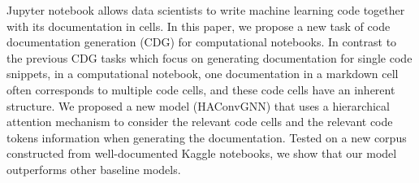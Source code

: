 Jupyter notebook allows data scientists to write machine learning code together with its documentation in cells. In this paper, we propose a new task of code documentation generation (CDG) for computational notebooks. In contrast to the previous CDG tasks which focus on generating documentation for single code snippets, in a computational notebook, one documentation in a markdown cell often corresponds to multiple code cells, and these code cells have an inherent structure. We proposed a new model (HAConvGNN) that uses a hierarchical attention mechanism to consider the relevant code cells and the relevant code tokens information when generating the documentation. Tested on a new corpus constructed from well-documented Kaggle notebooks, we show that our model outperforms other baseline models.
